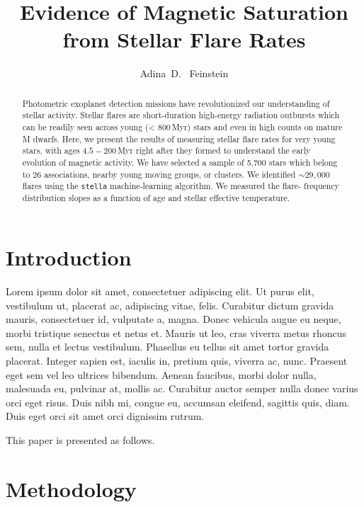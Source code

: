 \documentclass[twocolumn]{aastex631}
\begin{document}
\title{Evidence of Magnetic Saturation from Stellar Flare Rates}

\author{Adina~D.~ Feinstein}

\begin{abstract}
    Photometric exoplanet detection missions have revolutionized our understanding
    of stellar activity. Stellar flares are short-duration high-energy radiation
    outbursts which can be readily seen across young (< 800\,Myr) stars and even
    in high counts on mature M dwarfs. Here, we present the results of measuring
    stellar flare rates for very young stars, with ages $4.5 - 200$\,Myr right
    after they formed to understand the early evolution of magnetic activity. We
    have selected a sample of 5,700 stars which belong to 26 associations,
    nearby young moving groups, or clusters. We identified $\sim 29,000$ flares
    using the \texttt{stella} machine-learning algorithm. We measured the flare-
    frequency distribution slopes as a function of age and stellar effective
    temperature.
\end{abstract}

\section{Introduction}
\label{sec:intro}

Lorem ipsum dolor sit amet, consectetuer adipiscing elit.
Ut purus elit, vestibulum ut, placerat ac, adipiscing vitae, felis.
Curabitur dictum gravida mauris, consectetuer id, vulputate a, magna.
Donec vehicula augue eu neque, morbi tristique senectus et netus et.
Mauris ut leo, cras viverra metus rhoncus sem, nulla et lectus vestibulum.
Phasellus eu tellus sit amet tortor gravida placerat.
Integer sapien est, iaculis in, pretium quis, viverra ac, nunc.
Praesent eget sem vel leo ultrices bibendum.
Aenean faucibus, morbi dolor nulla, malesuada eu, pulvinar at, mollis ac.
Curabitur auctor semper nulla donec varius orci eget risus.
Duis nibh mi, congue eu, accumsan eleifend, sagittis quis, diam.
Duis eget orci sit amet orci dignissim rutrum.

This paper is presented as follows.

\section{Methodology}
\label{sec:methods}
\end{document}
